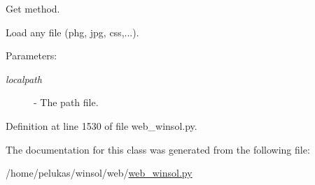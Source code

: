 Get method. 

Load any file (phg, jpg, css,...).

\begin{Desc}
\item[Parameters:]
\begin{description}
\item[{\em localpath}]- The path file. \end{description}
\end{Desc}


Definition at line 1530 of file web\_\-winsol.py.

The documentation for this class was generated from the following file:\begin{CompactItemize}
\item 
/home/pelukas/winsol/web/\hyperlink{web__winsol_8py}{web\_\-winsol.py}\end{CompactItemize}
